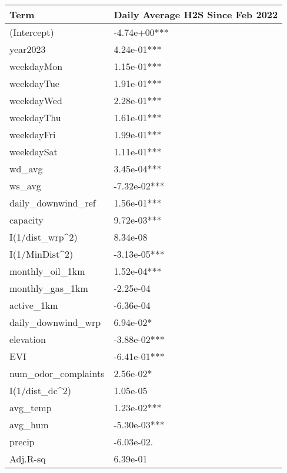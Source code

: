 
\begin{tabular}{l|l}
\hline
Term & Daily Average H2S Since Feb 2022\\
\hline
(Intercept) & -4.74e+00***\\
\hline
year2023 & 4.24e-01***\\
\hline
weekdayMon & 1.15e-01***\\
\hline
weekdayTue & 1.91e-01***\\
\hline
weekdayWed & 2.28e-01***\\
\hline
weekdayThu & 1.61e-01***\\
\hline
weekdayFri & 1.99e-01***\\
\hline
weekdaySat & 1.11e-01***\\
\hline
wd\_avg & 3.45e-04***\\
\hline
ws\_avg & -7.32e-02***\\
\hline
daily\_downwind\_ref & 1.56e-01***\\
\hline
capacity & 9.72e-03***\\
\hline
I(1/dist\_wrp\textasciicircum{}2) & 8.34e-08\\
\hline
I(1/MinDist\textasciicircum{}2) & -3.13e-05***\\
\hline
monthly\_oil\_1km & 1.52e-04***\\
\hline
monthly\_gas\_1km & -2.25e-04\\
\hline
active\_1km & -6.36e-04\\
\hline
daily\_downwind\_wrp & 6.94e-02*\\
\hline
elevation & -3.88e-02***\\
\hline
EVI & -6.41e-01***\\
\hline
num\_odor\_complaints & 2.56e-02*\\
\hline
I(1/dist\_dc\textasciicircum{}2) & 1.05e-05\\
\hline
avg\_temp & 1.23e-02***\\
\hline
avg\_hum & -5.30e-03***\\
\hline
precip & -6.03e-02.\\
\hline
Adj.R-sq & 6.39e-01\\
\hline
\end{tabular}
